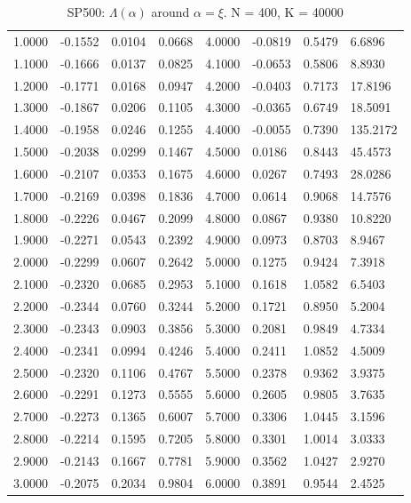 \documentclass[aoas,preprint]{imsart}
\numberwithin{equation}{section}
\theoremstyle{plain}
\begin{document}
\begin{itemize}
\begin{table}[htb!]
\begin{tabular}{l|l|l|l||l|l|l|l}
      1.0000 & -0.1552 & 0.0104 & 0.0668 & 4.0000 & -0.0819 & 0.5479 & 6.6896\\
      1.1000 & -0.1666 & 0.0137 & 0.0825 & 4.1000 & -0.0653 & 0.5806 & 8.8930\\
      1.2000 & -0.1771 & 0.0168 & 0.0947 & 4.2000 & -0.0403 & 0.7173 & 17.8196\\
      1.3000 & -0.1867 & 0.0206 & 0.1105 & 4.3000 & -0.0365 & 0.6749 & 18.5091\\
      1.4000 & -0.1958 & 0.0246 & 0.1255 & 4.4000 & -0.0055 & 0.7390 & 135.2172\\
      1.5000 & -0.2038 & 0.0299 & 0.1467 & 4.5000 & 0.0186 & 0.8443 & 45.4573\\
      1.6000 & -0.2107 & 0.0353 & 0.1675 & 4.6000 & 0.0267 & 0.7493 & 28.0286\\
      1.7000 & -0.2169 & 0.0398 & 0.1836 & 4.7000 & 0.0614 & 0.9068 & 14.7576\\
      1.8000 & -0.2226 & 0.0467 & 0.2099 & 4.8000 & 0.0867 & 0.9380 & 10.8220\\
      1.9000 & -0.2271 & 0.0543 & 0.2392 & 4.9000 & 0.0973 & 0.8703 & 8.9467\\
      2.0000 & -0.2299 & 0.0607 & 0.2642 & 5.0000 & 0.1275 & 0.9424 & 7.3918\\
      2.1000 & -0.2320 & 0.0685 & 0.2953 & 5.1000 & 0.1618 & 1.0582 & 6.5403\\
      2.2000 & -0.2344 & 0.0760 & 0.3244 & 5.2000 & 0.1721 & 0.8950 & 5.2004\\
      2.3000 & -0.2343 & 0.0903 & 0.3856 & 5.3000 & 0.2081 & 0.9849 & 4.7334\\
      2.4000 & -0.2341 & 0.0994 & 0.4246 & 5.4000 & 0.2411 & 1.0852 & 4.5009\\
      2.5000 & -0.2320 & 0.1106 & 0.4767 & 5.5000 & 0.2378 & 0.9362 & 3.9375\\
      2.6000 & -0.2291 & 0.1273 & 0.5555 & 5.6000 & 0.2605 & 0.9805 & 3.7635\\
      2.7000 & -0.2273 & 0.1365 & 0.6007 & 5.7000 & 0.3306 & 1.0445 & 3.1596\\
      2.8000 & -0.2214 & 0.1595 & 0.7205 & 5.8000 & 0.3301 & 1.0014 & 3.0333\\
      2.9000 & -0.2143 & 0.1667 & 0.7781 & 5.9000 & 0.3562 & 1.0427 & 2.9270\\
      3.0000 & -0.2075 & 0.2034 & 0.9804 & 6.0000 & 0.3891 & 0.9544 & 2.4525
    \end{tabular}
    \caption{SP500: $\Lambda(\alpha)$ around $\alpha = \xi$. N = 400, K = 40000}
    \label{tab:SP500_garch21_tail_index}
  \end{table}


\end{itemize}
\end{document}
